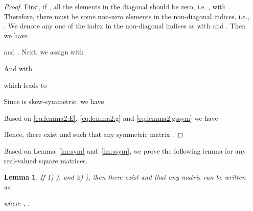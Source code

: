 \documentclass[10pt,journal,compsoc]{IEEEtran}
\newtheorem{lemma}{Lemma}
\begin{document}
\begin{proof}
First,
if ,
all the elements in the diagonal should be zero,
i.e. , with .
Therefore,
there must be some non-zero elements in the non-diagonal indices,
i.e.,
.
We denote any one of the index in the non-diagonal indices as
 with  and .
Then we have

and .
Next,
we assign 
 with

And  with

which leads to



Since  is skew-symmetric,
we have

Based on \eqref{eq:lemma2:E}, \eqref{eq:lemma2:g} and \eqref{eq:lemma2:gssym}
we have


Hence,
there exist  and  
such that any symmetric matrix .
\end{proof}




Based on Lemma~\ref{lm:sym} and~\ref{lm:ssym},
we prove the following lemma for any real-valued square matrices.


\begin{lemma}
	\label{lm:matrix}
	If
	1) ),
	and
	2) ),
	then
	there exist  and 
	that any matrix 
	can be written as 
	
	where , 
	.
\end{lemma}
\end{document}
